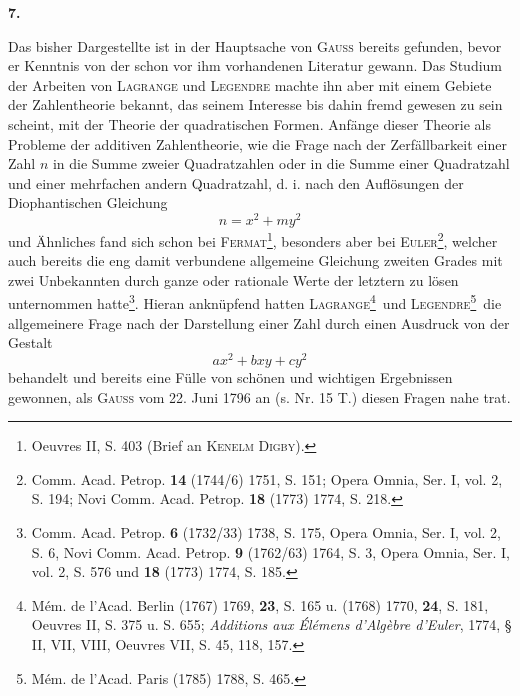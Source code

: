 \begin{center}\end{center}
\begin{center}\bfseries 7.\end{center}
\noindent\hspace*{\parindent}Das bisher Dargestellte ist in der Hauptsache von \textsc{Gauss} bereits gefunden, bevor er Kenntnis von der schon vor ihm vorhandenen Literatur gewann. Das Studium der Arbeiten von \textsc{Lagrange} und \textsc{Legendre} machte ihn aber mit einem Gebiete der Zahlentheorie bekannt, das seinem Interesse bis dahin fremd gewesen zu sein scheint, mit der Theorie der quadratischen Formen. Anfänge dieser Theorie als Probleme der additiven Zahlentheorie, wie die Frage nach der Zerfällbarkeit einer Zahl \(n\) in die Summe zweier Quadratzahlen oder in die Summe einer Quadratzahl und einer mehrfachen andern Quadratzahl, d. i. nach den Auflösungen der Diophantischen Gleichung
\newpage{}
\[
n=x^2+my^2
\]
und Ähnliches fand sich schon bei \textsc{Fermat}\footnote{Oeuvres II, S. 403 (Brief an \textsc{Kenelm Digby}).}, besonders aber bei \textsc{Euler}\begingroup\renewcommand{\thefootnote}{**)}\footnote{Comm. Acad. Petrop. \textbf{14} (1744/6) 1751, S. 151; Opera Omnia, Ser. I, vol. 2, S. 194; Novi Comm. Acad. Petrop. \textbf{18} (1773) 1774, S. 218.}\endgroup, welcher auch bereits die eng damit verbundene allgemeine Gleichung zweiten Grades mit zwei Unbekannten durch ganze oder rationale Werte der letztern zu lösen unternommen hatte\begingroup\renewcommand{\thefootnote}{***)}\footnote{Comm. Acad. Petrop. \textbf{6} (1732/33) 1738, S. 175, Opera Omnia, Ser. I, vol. 2, S. 6, Novi Comm. Acad. Petrop. \textbf{9} (1762/63) 1764, S. 3, Opera Omnia, Ser. I, vol. 2, S. 576 und \textbf{18} (1773) 1774, S. 185.}\endgroup. Hieran anknüpfend hatten \textsc{Lagrange}\begingroup\renewcommand{\thefootnote}{\ensuremath{\dagger})}\footnote{Mém. de l’Acad. Berlin (1767) 1769, \textbf{23}, S. 165 u. (1768) 1770, \textbf{24}, S. 181, Oeuvres II, S. 375 u. S. 655; \textit{Additions aux Élémens d’Algèbre d’Euler}, 1774, § II, VII, VIII, Oeuvres VII, S. 45, 118, 157.}\endgroup\ und \textsc{Legendre}\begingroup\renewcommand{\thefootnote}{\ensuremath{\dagger\dagger})}\footnote{Mém. de l’Acad. Paris (1785) 1788, S. 465.}\endgroup\ die allgemeinere Frage nach der Darstellung einer Zahl durch einen Ausdruck von der Gestalt
\[
ax^2+bxy+cy^2
\]
behandelt und bereits eine Fülle von schönen und wichtigen Ergebnissen gewonnen, als \textsc{Gauss} vom 22. Juni 1796 an (s. Nr. 15 T.) diesen Fragen nahe trat.

